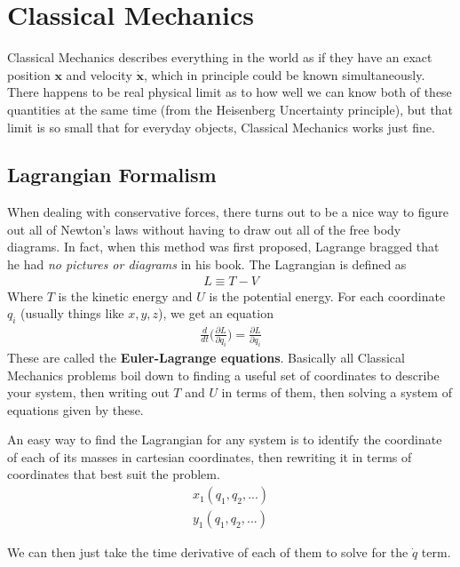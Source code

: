 \chapter{Classical Mechanics}

Classical Mechanics describes everything in the world as if they have an exact position $\textbf{x}$ and velocity $\dot{\textbf{x}}$, which in principle could be known simultaneously. There happens to be real physical limit as to how well we can know both of these quantities at the same time (from the Heisenberg Uncertainty principle), but that limit is so small that for everyday objects, Classical Mechanics works just fine.


\section{Lagrangian Formalism}
When dealing with conservative forces, there turns out to be a nice way to figure out all of Newton's laws without having to draw out all of the free body diagrams. In fact, when this method was first proposed, Lagrange bragged that he had \emph{no pictures or diagrams} in his book\cite{lagrange}. The Lagrangian is defined as 
\begin{align}
L\equiv T-V
\end{align}
Where $T$ is the kinetic energy and $U$ is the potential energy. For each coordinate $q_i$ (usually things like $x,y,z$), we get an equation 
\begin{align}
\boxed{\frac{d}{dt}\Big(\frac{\partial L}{\partial \dot{q}_i}\Big) = \frac{\partial L}{\partial q_i} }
\end{align}
These are called the \textbf{Euler-Lagrange equations}. Basically all Classical Mechanics problems boil down to finding a useful set of coordinates to describe your system, then writing out $T$ and $U$ in terms of them, then solving a system of equations given by these.


     An easy way to find the Lagrangian for any system is to identify the coordinate of each of its masses in cartesian coordinates, then rewriting it in terms of coordinates that best suit the problem. 
     \begin{align}
        x_1(q_1,q_2,...)\\
        y_1(q_1,q_2,...)
     \end{align}
     
     We can then just take the time derivative of each of them to solve for the $\dot{q}$ term.




